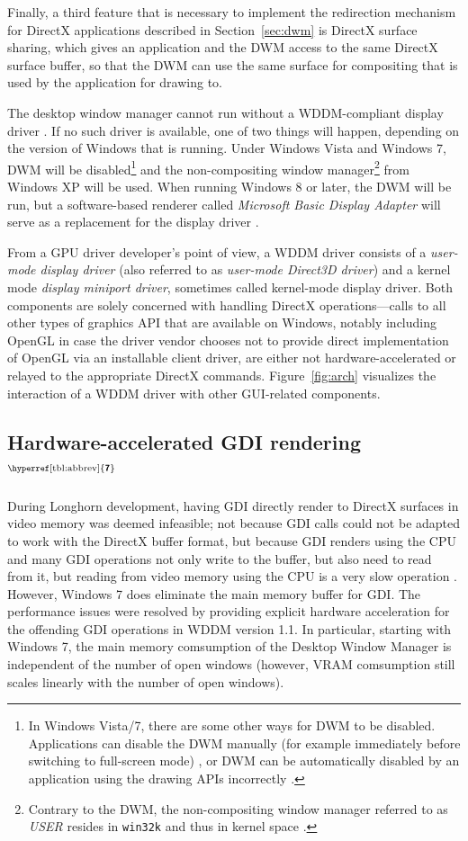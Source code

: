 \documentclass[10pt,twocolumn,a4paper]{article}
\newcommand{\bs}[1]{\textbf{\sffamily #1}}
\newcommand{\winver}[1]{$^{\text{\hyperref[tbl:abbrev]{\bs{#1}}}}$}
\newcommand{\winsubsection}[2]{\subsection[#1]{#1\winver{#2}}}
\begin{document}
			Finally, a third feature that is necessary to implement the redirection
			mechanism for DirectX applications described in Section~\ref{sec:dwm}
			is DirectX surface sharing, which gives an application and the DWM
			access to the same DirectX surface buffer, so that the DWM can use the
			same surface for compositing that is used by the application for
			drawing to. \cite{dwmredirect}

			The desktop window manager cannot run without a WDDM-compliant
			display driver \cite{dwmwddm}. If no such driver is available, one
			of two things will happen, depending on the version of Windows that
			is running. Under Windows Vista and Windows 7, DWM will be
			disabled\footnote{In Windows Vista/7, there are some other ways for
			DWM to be disabled. Applications can disable the DWM manually (for
			example immediately before switching to full-screen mode)
			\cite{disabledwm}, or DWM can be automatically disabled by an
			application using the drawing APIs incorrectly \cite{dwmredirect}.}
			and the non-compositing window manager\footnote{Contrary to the DWM,
			the non-compositing window manager referred to as \textit{USER} resides
			in \texttt{win32k} and thus in kernel space \cite{probertwin32k}.}
			from Windows XP will be used. When running Windows 8 or later,
			the DWM will be run, but a software-based renderer called
			\textit{Microsoft Basic Display Adapter} will serve as a replacement
			for the display driver \cite{dwmalwayson}.

			From a GPU driver developer's point of view, a WDDM driver consists
			of a \textit{user-mode display driver} (also referred to as
			\textit{user-mode Direct3D driver}) and a kernel mode
			\textit{display miniport driver}, sometimes called kernel-mode
			display driver. Both components are solely concerned with handling
			DirectX operations---calls to all other types of graphics API that
			are available on Windows, notably including OpenGL in case the driver
			vendor chooses not to provide direct implementation of OpenGL via
			an installable client driver, are either not
			hardware-accelerated or relayed to the appropriate DirectX commands.
			Figure~\ref{fig:arch} visualizes the interaction of a WDDM driver with
			other GUI-related components.
			\cite{wddmarch,d2dvsgdi}

		\winsubsection{Hardware-accelerated GDI ren\-der\-ing}{7}
			During Longhorn development, having GDI directly render to DirectX
			surfaces in video memory was deemed infeasible; not because GDI calls
			could not be adapted to work with the DirectX buffer format, but because
			GDI renders using the CPU and many GDI operations not only write to
			the buffer, but also need to read from it, but reading from video memory
			using the CPU is a very slow operation \cite{dwmredirect}. However,
			Windows 7 does eliminate the main memory buffer for GDI. The performance
			issues were resolved by providing explicit hardware acceleration for
			the offending GDI operations in WDDM version 1.1. In particular,
			starting with Windows 7, the
			main memory comsumption of the Desktop Window Manager is independent
			of the number of open windows (however, VRAM comsumption still scales
			linearly with the number of open windows).
			\cite{win7}

	\onecolumn{\printbibliography}
\end{document}
